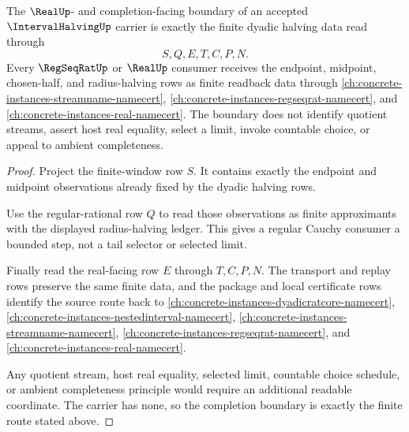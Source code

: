 \begin{theorem}
\label{thm:interval-halving-real-completion-boundary}
The $\RealUp$- and completion-facing boundary of an accepted $\IntervalHalvingUp$ carrier is exactly the finite dyadic halving data read through
$$
S,Q,E,T,C,P,N.
$$
Every $\RegSeqRatUp$ or $\RealUp$ consumer receives the endpoint, midpoint, chosen-half, and radius-halving rows as finite readback data through \autoref{ch:concrete-instances-streamname-namecert}, \autoref{ch:concrete-instances-regseqrat-namecert}, and \autoref{ch:concrete-instances-real-namecert}. The boundary does not identify quotient streams, assert host real equality, select a limit, invoke countable choice, or appeal to ambient completeness.
\end{theorem}
\begin{proof}
Project the finite-window row $S$. It contains exactly the endpoint and midpoint observations already fixed by the dyadic halving rows.

Use the regular-rational row $Q$ to read those observations as finite approximants with the displayed radius-halving ledger. This gives a regular Cauchy consumer a bounded step, not a tail selector or selected limit.

Finally read the real-facing row $E$ through $T,C,P,N$. The transport and replay rows preserve the same finite data, and the package and local certificate rows identify the source route back to \autoref{ch:concrete-instances-dyadicratcore-namecert}, \autoref{ch:concrete-instances-nestedinterval-namecert}, \autoref{ch:concrete-instances-streamname-namecert}, \autoref{ch:concrete-instances-regseqrat-namecert}, and \autoref{ch:concrete-instances-real-namecert}.

Any quotient stream, host real equality, selected limit, countable choice schedule, or ambient completeness principle would require an additional readable coordinate. The carrier has none, so the completion boundary is exactly the finite route stated above.
\end{proof}


